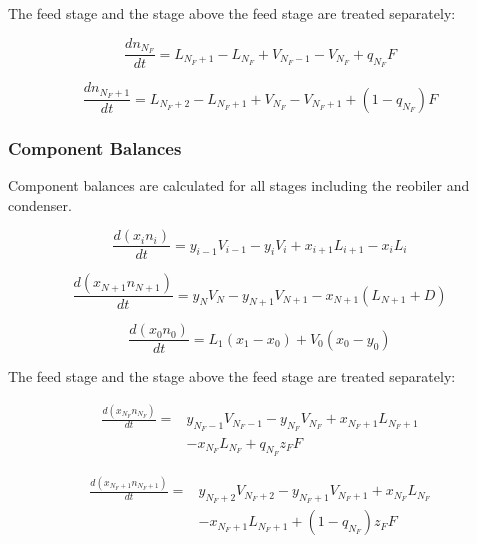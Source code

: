 The  feed stage and the stage above the feed stage are treated separately:

\begin{equation}
    \frac{dn_{N_F}}{dt} = L_{N_F+1}-L_{N_F} + V_{N_F-1}-V_{N_F} + q_{N_F}F   
\end{equation}

\begin{equation}
   \frac{dn_{N_F+1}}{dt} = L_{N_F+2}-L_{N_F+1} + V_{N_F}-V_{N_F+1} + (1-q_{N_F})F 
\end{equation}


\subsubsection{Component Balances}

Component balances are calculated for all stages including the reobiler and condenser.

\begin{equation}
   \frac{d(x_{i} n_{i})}{dt}= y_{i-1}V_{i-1} -y_iV_i + x_{i+1}L_{i+1} - x_{i}L_i 
\end{equation}

\begin{equation}
    \frac{d(x_{N+1} n_{N+1})}{dt}  = y_NV_N - y_{N+1}V_{N+1} - x_{N+1}(L_{N+1} + D) 
\end{equation}


\begin{equation}
     \frac{d(x_{0} n_{0})}{dt} = L_1(x_1-x_0) + V_0(x_0-y_0) 
\end{equation}

The  feed stage and the stage above the feed stage are treated separately:

\begin{equation}
\begin{split}
 \frac{d(x_{N_F} n_{N_F})}{dt} =  & y_{N_F-1}V_{N_F-1} -y_{N_F}V_{N_F} + x_{N_F+1}L_{N_F+1} \\ & - x_{N_F}L_{N_F} + q_{N_F}z_FF   
\end{split}
\end{equation}

\begin{equation}
\begin{split}
    \frac{d(x_{N_F+1} n_{N_F+1})}{dt} =  & y_{N_F+2}V_{N_F+2} -y_{N_F+1}V_{N_F+1} + x_{N_F}L_{N_F} \\ & - x_{N_F+1}L_{N_F+1}  + (1-q_{N_F})z_FF 
\end{split}
\end{equation}


